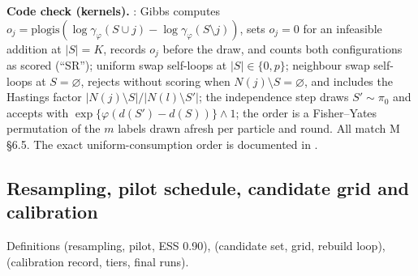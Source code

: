 \textbf{Code check (kernels).} :
Gibbs computes $o_j=\mathrm{plogis}(\log\gamma_\varphi(S\cup j)-\log\gamma_\varphi(S\setminus j))$, sets $o_j=0$ for an infeasible
addition at $|S|=K$, records $o_j$ before the draw, and counts both configurations as scored (``SR'');
uniform swap self-loops at $|S|\in\{0,p\}$; neighbour swap self-loops at $S=\varnothing$, rejects without scoring when
$N(j)\setminus S=\varnothing$, and includes the Hastings factor $|N(j)\setminus S|/|N(l)\setminus S'|$; the independence step
draws $S'\sim\pi_0$ and accepts with $\exp\{\varphi(d(S')-d(S))\}\wedge1$; the order is a Fisher--Yates permutation of the $m$
labels drawn afresh per particle and round. All match M \S6.5. The exact uniform-consumption order is documented in
.

\subsection{Resampling, pilot schedule, candidate grid and calibration}\label{sec:method-calib}

Definitions  (resampling, pilot, ESS 0.90),  (candidate set, grid, rebuild loop), 
(calibration record, tiers, final runs).

